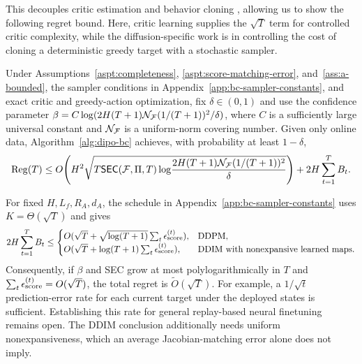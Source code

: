 This decouples critic estimation and behavior cloning \citep{li2024learningmultimodalbehaviorsscratch}, allowing us to show the following regret bound. Here, critic learning supplies the $\sqrt T$ term for controlled critic complexity, while the diffusion-specific work is in controlling the cost of cloning a deterministic greedy target with a stochastic sampler.
\begin{thm}
\label{thm:dipo-bc-regret}
Under Assumptions~\ref{aspt:completeness}, \ref{aspt:score-matching-error}, and~\ref{ass:a-bounded}, the sampler conditions in Appendix~\ref{app:bc-sampler-constants}, and exact critic and greedy-action optimization, fix $\delta\in(0,1)$ and use the confidence parameter $\beta=C\log(2H(T+1){\mathcal{N}}_{\mathcal{F}}(1/(T+1))^2/\delta)$, where $C$ is a sufficiently large universal constant and ${\mathcal{N}}_{\mathcal{F}}$ is a uniform-norm covering number. Given only online data, Algorithm~\ref{alg:dipo-bc} achieves, with probability at least $1-\delta$,
\[
 \mathrm{Reg}(T)\le O\!\left(H^2\sqrt{T\mathsf{SEC}({\mathcal{F}},\Pi,T)
       \log\!\frac{2H(T+1){\mathcal{N}}_{\mathcal{F}}(1/(T+1))^2}{\delta}}\right)
                       +2H\sum_{t=1}^T B_t.
\]
\end{thm}
For fixed $H,L_f,R_A,d_A$, the schedule in Appendix~\ref{app:bc-sampler-constants} uses $K=\Theta(\sqrt T)$ and gives
\begin{equation}\label{eq:bc-sampler-rates}
 2H\sum_{t=1}^T B_t\le
 \begin{cases}
 O(\sqrt T+\sqrt{\log(T+1)}\sum_t\epsilon_{\text{score}}^{(t)}),&\text{DDPM},\\
 O(\sqrt T+\log(T+1)\sum_t\epsilon_{\text{score}}^{(t)}),&\text{DDIM with nonexpansive learned maps}.
 \end{cases}
\end{equation}
Consequently, if $\beta$ and SEC grow at most polylogarithmically in $T$ and $\sum_t\epsilon_{\text{score}}^{(t)}=O(\sqrt T)$, the total regret is $\widetilde O(\sqrt T)$. For example, a $1/\sqrt t$ prediction-error rate for each current target under the deployed states is sufficient. Establishing this rate for general replay-based neural finetuning remains open. The DDIM conclusion additionally needs uniform nonexpansiveness, which an average Jacobian-matching error alone does not imply.


